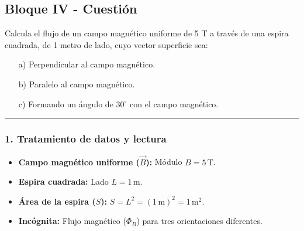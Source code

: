\newpage

\subsection{Bloque IV - Cuestión}
\label{subsec:B4_2010_sep_ext}

\begin{cajaenunciado}
Calcula el flujo de un campo magnético uniforme de 5 T a través de una espira cuadrada, de 1 metro de lado, cuyo vector superficie sea:
\begin{enumerate}
    \item[a)] Perpendicular al campo magnético.
    \item[b)] Paralelo al campo magnético.
    \item[c)] Formando un ángulo de $30^{\circ}$ con el campo magnético.
\end{enumerate}
\end{cajaenunciado}
\hrule

\subsubsection*{1. Tratamiento de datos y lectura}
\begin{itemize}
    \item \textbf{Campo magnético uniforme ($\vec{B}$):} Módulo $B = 5 \, \text{T}$.
    \item \textbf{Espira cuadrada:} Lado $L = 1 \, \text{m}$.
    \item \textbf{Área de la espira ($S$):} $S = L^2 = (1 \, \text{m})^2 = 1 \, \text{m}^2$.
    \item \textbf{Incógnita:} Flujo magnético ($\Phi_B$) para tres orientaciones diferentes.
\end{itemize}

